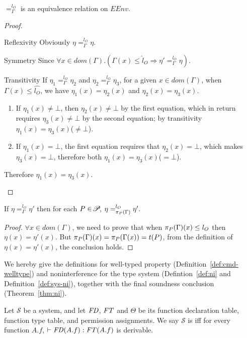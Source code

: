 {{{\begin{lemma}\label{lem:ni-eq}
$=_{\Gamma}^{l_{O}}$ is an equivalence relation on $EEnv$.
\end{lemma}
 \begin{proof}
\begin{ProofEnumDesc}[style=standard]
	\item [Reflexivity] Obviously $\eta=_{\Gamma}^{l_O}\eta$.
	\item [Symmetry] Since $\forall x\in dom(\Gamma). (\Gamma(x)\leq\hat{l}_O\Rightarrow\eta'=_{\Gamma}^{l_O}\eta)$.
	\item [Transitivity] If $\eta_1=_{\Gamma}^{l_O}\eta_2$ and $\eta_2=_{\Gamma}^{l_O}\eta_3$, for a given $x\in dom(\Gamma)$, when $\Gamma(x)\leq\hat{l_O}$, we have $\eta_1(x)=\eta_2(x)$ and $\eta_2(x)=\eta_3(x)$.
	\begin{enumerate}[label={(\arabic*)}]
	\item If $\eta_1(x)\neq\bot$, then $\eta_2(x)\neq\bot$ by the first equation, which in return requires $\eta_3(x)\neq\bot$ by the second equation; by transitivity $\eta_1(x)=\eta_3(x)$($\neq\bot$).
	\item If $\eta_1(x)=\bot$, the first equation requires that $\eta_2(x)=\bot$, which makes $\eta_3(x)=\bot$, therefore both $\eta_1(x)=\eta_3(x)$($=\bot$).
	\end{enumerate}
	Therefore $\eta_1(x)=\eta_3(x)$.
\end{ProofEnumDesc}
 \end{proof}

 \begin{lemma}\label{lem:proj}
If $\eta =_{\Gamma}^{l_{O}} \eta'$
then for each $P\in\PPS$,
$\eta =_{\app{\Gamma}{P}}^{l_O} \eta'.$
\end{lemma}
 \begin{proof}
$\forall x\in dom(\Gamma)$, we need to prove that when $\app{\Gamma}{P}(x)\leq l_O$ then $\eta(x)=\eta'(x)$. But $\app{\Gamma}{P}(x)=\app{\Gamma(x)}{P}=t(P)$, from the definition of $\eta(x)=\eta'(x)$, the conclusion holds.
 \end{proof}



We hereby give the definitions for well-typed property
(Definition~\ref{def:cmd-welltype}) and noninterference for the type
system (Defintion~\ref{def:ni} and Definition~\ref{def:sys-ni}),
together with the final soundness conclusion
(Theorem~\ref{thm:ni}).


\begin{definition}\label{def:cmd-welltype}
Let $\mathcal{S}$ be a system, and let $\FD$, $\FT$ and $\Theta$ be
its function declaration table, function type table, and permission
assignments. We say $\mathcal{S}$ is  iff for
every function $A.f$, $\vdash \FD(A.f) : \FT(A.f)$ is derivable.
\end{definition}


}}}
